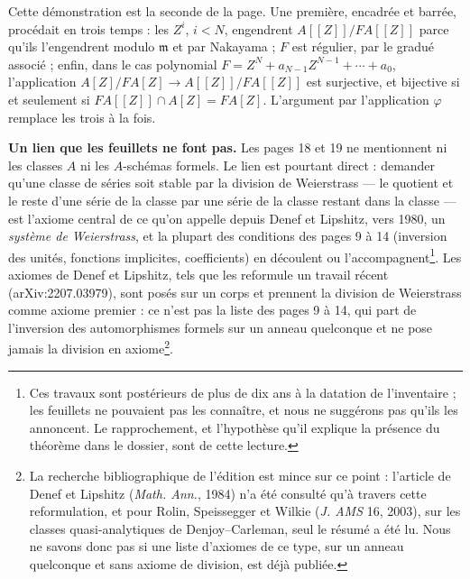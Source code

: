 \documentclass[11pt,a4paper]{article}
\begin{document}
Cette démonstration est la seconde de la page. Une première, encadrée et
barrée, procédait en trois temps : les $Z^i$, $i < N$, engendrent
$A[[Z]]/F A[[Z]]$ parce qu'ils l'engendrent modulo $\mathfrak{m}$ et par
Nakayama ; $F$ est régulier, par le gradué associé ; enfin, dans le cas
polynomial $F = Z^N + a_{N-1} Z^{N-1} + \cdots + a_0$, l'application
$A[Z]/F A[Z] \to A[[Z]]/F A[[Z]]$ est surjective, et bijective si et seulement
si $F A[[Z]] \cap A[Z] = F A[Z]$. L'argument par l'application $\varphi$ remplace
les trois à la fois.

\textbf{Un lien que les feuillets ne font pas.} Les pages 18 et 19 ne mentionnent
ni les classes $A$ ni les $A$-schémas formels. Le lien est pourtant direct :
demander qu'une classe de séries soit stable par la division de Weierstrass —
le quotient et le reste d'une série de la classe par une série de la classe
restant dans la classe — est l'axiome central de ce qu'on appelle depuis
Denef et Lipshitz, vers 1980, un \emph{système de Weierstrass}, et la plupart
des conditions des pages 9 à 14 (inversion des unités, fonctions implicites,
coefficients) en découlent ou l'accompagnent\footnote{Ces travaux sont
postérieurs de plus de dix ans à la datation de l'inventaire ; les feuillets
ne pouvaient pas les connaître, et nous ne suggérons pas qu'ils les
annoncent. Le rapprochement, et l'hypothèse qu'il explique la présence du
théorème dans le dossier, sont de cette lecture.}. Les axiomes de Denef et
Lipshitz, tels que les reformule un travail récent (arXiv:2207.03979), sont
posés sur un corps et prennent la division de Weierstrass comme axiome
premier : ce n'est pas la liste des pages 9 à 14, qui part de l'inversion des
automorphismes formels sur un anneau quelconque et ne pose jamais la division
en axiome\footnote{La recherche bibliographique de l'édition est mince sur ce
point : l'article de Denef et Lipshitz (\emph{Math. Ann.}, 1984) n'a été
consulté qu'à travers cette reformulation, et pour Rolin, Speissegger et Wilkie
(\emph{J. AMS} 16, 2003), sur les classes quasi-analytiques de Denjoy--Carleman,
seul le résumé a été lu. Nous ne savons donc pas si une liste d'axiomes de ce
type, sur un anneau quelconque et sans axiome de division, est déjà
publiée.}.
\end{document}
